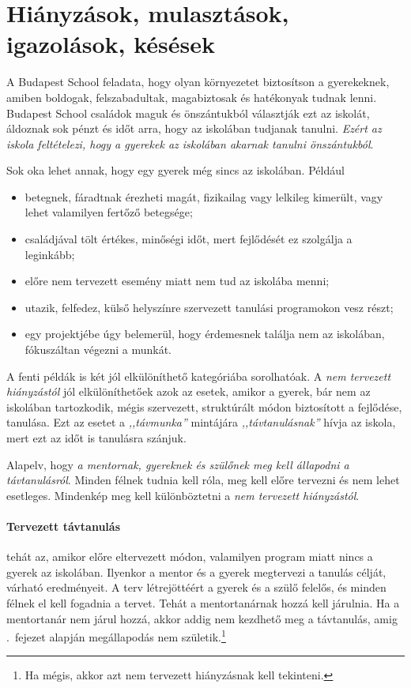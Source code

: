 \section{Hiányzások, mulasztások, igazolások, késések}

A Budapest School feladata, hogy olyan környezetet biztosítson a gyerekeknek, amiben boldogak, felszabadultak, magabiztosak és hatékonyak tudnak lenni. Budapest School családok maguk és önszántukból választják ezt az iskolát, áldoznak sok pénzt és időt arra, hogy az iskolában tudjanak tanulni. \emph{Ezért az iskola feltételezi, hogy a gyerekek az iskolában akarnak tanulni önszántukból}.

Sok oka lehet annak, hogy egy gyerek még sincs az iskolában. Például
\begin{itemize}
    \item betegnek, fáradtnak érezheti magát, fizikailag vagy lelkileg kimerült, vagy lehet valamilyen fertőző betegsége;
    \item családjával tölt értékes, minőségi időt, mert fejlődését ez szolgálja a leginkább;
    \item előre nem tervezett esemény miatt nem tud az iskolába menni;
    \item utazik, felfedez, külső helyszínre szervezett tanulási programokon vesz részt;
    \item egy projektjébe úgy belemerül, hogy érdemesnek találja nem az iskolában, fóku\-száltan végezni a munkát.
 \end{itemize}

A fenti példák is két jól elkülöníthető kategóriába sorolhatóak. A \emph{nem tervezett hiányzástól} jól elkülöníthetőek azok az esetek, amikor a gyerek, bár nem az iskolában tartozkodik, mégis szervezett, struktúrált módon biztosított a fejlődése, tanulása. Ezt az esetet a \emph{,,távmunka''} mintájára \emph{,,távtanulásnak''} hívja az iskola, mert ezt az időt is tanulásra szánjuk.

Alapelv, hogy \emph{a mentornak, gyereknek és szülőnek meg kell állapodni a távtanulásról}. Minden félnek tudnia kell róla, meg kell előre tervezni és nem lehet esetleges. Mindenkép meg kell különböztetni a \emph{nem tervezett hiányzástól}.

\paragraph{Tervezett távtanulás} tehát az, amikor előre eltervezett módon, valamilyen program miatt nincs a gyerek az iskolában. Ilyenkor a mentor és a gyerek megtervezi a tanulás célját, várható eredményeit. A terv létrejöttéért a gyerek és a szülő felelős, és minden félnek el kell fogadnia a tervet. Tehát a mentortanárnak hozzá kell járulnia. Ha a mentortanár nem járul hozzá, akkor addig nem kezdhető meg a távtanulás, amig .~fejezet alapján megállapodás nem születik.\footnote{Ha mégis, akkor azt nem tervezett hiányzásnak kell tekinteni.}


